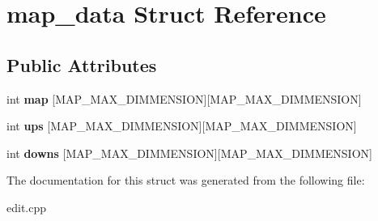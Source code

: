 \hypertarget{structmap__data}{\section{map\-\_\-data Struct Reference}
\label{structmap__data}
}
\subsection*{Public Attributes}
\begin{DoxyCompactItemize}
\item 
\hypertarget{structmap__data_a0170274f605ffb6e847e6e66f1c88b11}{int {\bfseries map} \mbox{[}M\-A\-P\-\_\-\-M\-A\-X\-\_\-\-D\-I\-M\-M\-E\-N\-S\-I\-O\-N\mbox{]}\mbox{[}M\-A\-P\-\_\-\-M\-A\-X\-\_\-\-D\-I\-M\-M\-E\-N\-S\-I\-O\-N\mbox{]}}\label{structmap__data_a0170274f605ffb6e847e6e66f1c88b11}

\item 
\hypertarget{structmap__data_a94a5e51d7057378e683988bb082a6dc2}{int {\bfseries ups} \mbox{[}M\-A\-P\-\_\-\-M\-A\-X\-\_\-\-D\-I\-M\-M\-E\-N\-S\-I\-O\-N\mbox{]}\mbox{[}M\-A\-P\-\_\-\-M\-A\-X\-\_\-\-D\-I\-M\-M\-E\-N\-S\-I\-O\-N\mbox{]}}\label{structmap__data_a94a5e51d7057378e683988bb082a6dc2}

\item 
\hypertarget{structmap__data_a7e93f0db5466398f6f4efd84051ce303}{int {\bfseries downs} \mbox{[}M\-A\-P\-\_\-\-M\-A\-X\-\_\-\-D\-I\-M\-M\-E\-N\-S\-I\-O\-N\mbox{]}\mbox{[}M\-A\-P\-\_\-\-M\-A\-X\-\_\-\-D\-I\-M\-M\-E\-N\-S\-I\-O\-N\mbox{]}}\label{structmap__data_a7e93f0db5466398f6f4efd84051ce303}

\end{DoxyCompactItemize}


The documentation for this struct was generated from the following file\-:\begin{DoxyCompactItemize}
\item 
edit.\-cpp\end{DoxyCompactItemize}
